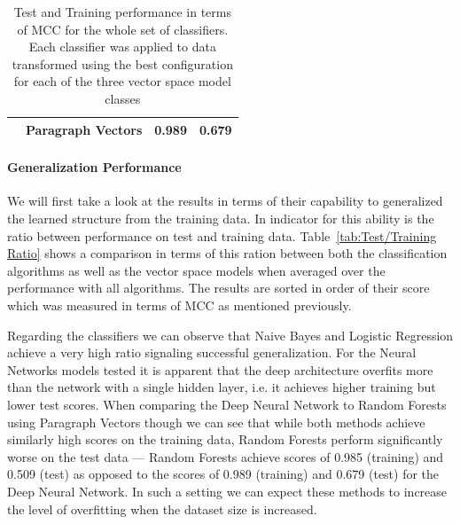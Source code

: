 \begin{table}[h]
\begin{center}
\begin{tabular}{ ll cc }
       & Paragraph Vectors & 0.989 & 0.679 \\
      \bottomrule
    \end{tabular}
  \caption{Test and Training performance in terms of \gls{MCC} for the whole set of classifiers. Each classifier was applied to data transformed using the best configuration for each of the three vector space model classes}
\label{tab:Classifier Results}
\end{center}
\end{table}

\paragraph{Generalization Performance}
\label{par:Generalization Performance}

We will first take a look at the results in terms of their capability to generalized the learned structure from the training data. In indicator for this ability is the ratio between performance on test and training data. Table~\ref{tab:Test/Training Ratio} shows a comparison in terms of this ration between both the classification algorithms as well as the vector space models when averaged over the performance with all algorithms. The results are sorted in order of their score which was measured in terms of \gls{MCC} as mentioned previously.

Regarding the classifiers we can observe that Naive Bayes and Logistic Regression achieve a very high ratio signaling successful generalization.
For the Neural Networks models tested it is apparent that the deep architecture overfits more than the network with a single hidden layer, i.e. it achieves higher training but lower test scores. When comparing the Deep Neural Network to Random Forests using Paragraph Vectors though we can see that while both methods achieve similarly high scores on the training data, Random Forests perform significantly worse on the test data --- Random Forests achieve scores of 0.985 (training) and 0.509 (test) as opposed to the scores of 0.989 (training) and 0.679 (test) for the Deep Neural Network. In such a setting we can expect these methods to increase the level of overfitting when the dataset size is increased.


